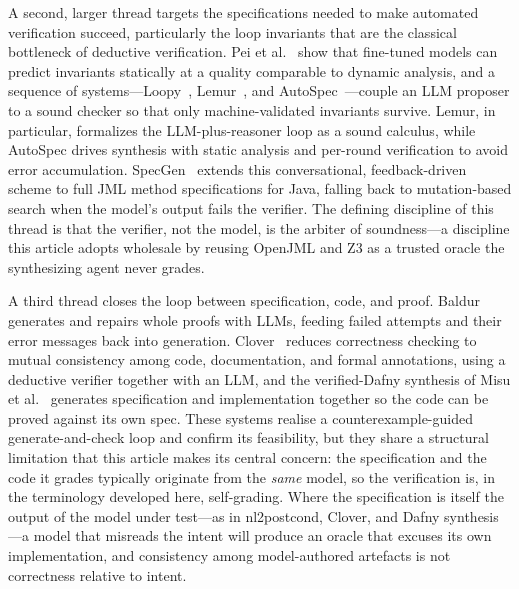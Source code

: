 A second, larger thread targets the specifications needed to make automated verification succeed, particularly the loop invariants that are the classical bottleneck of deductive verification. Pei et al.~\cite{pei2023invariants} show that fine-tuned models can predict invariants statically at a quality comparable to dynamic analysis, and a sequence of systems---Loopy~\cite{kamath2023loopy}, Lemur~\cite{wu2024lemur}, and AutoSpec~\cite{wen2024autospec}---couple an LLM proposer to a sound checker so that only machine-validated invariants survive. Lemur, in particular, formalizes the LLM-plus-reasoner loop as a sound calculus, while AutoSpec drives synthesis with static analysis and per-round verification to avoid error accumulation. SpecGen~\cite{ma2025specgen} extends this conversational, feedback-driven scheme to full JML method specifications for Java, falling back to mutation-based search when the model's output fails the verifier. The defining discipline of this thread is that the verifier, not the model, is the arbiter of soundness---a discipline this article adopts wholesale by reusing OpenJML and Z3 as a trusted oracle the synthesizing agent never grades.

A third thread closes the loop between specification, code, and proof. Baldur~\cite{first2023baldur} generates and repairs whole proofs with LLMs, feeding failed attempts and their error messages back into generation. Clover~\cite{sun2024clover} reduces correctness checking to mutual consistency among code, documentation, and formal annotations, using a deductive verifier together with an LLM, and the verified-Dafny synthesis of Misu et al.~\cite{misu2024dafny} generates specification and implementation together so the code can be proved against its own spec. These systems realise a counterexample-guided generate-and-check loop and confirm its feasibility, but they share a structural limitation that this article makes its central concern: the specification and the code it grades typically originate from the \emph{same} model, so the verification is, in the terminology developed here, self-grading. Where the specification is itself the output of the model under test---as in nl2postcond, Clover, and Dafny synthesis---a model that misreads the intent will produce an oracle that excuses its own implementation, and consistency among model-authored artefacts is not correctness relative to intent.

